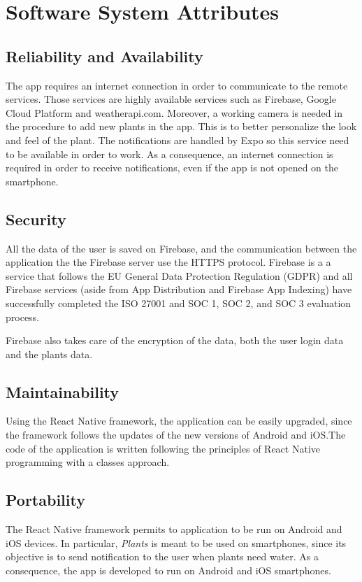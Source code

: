 \documentclass[10pt]{article}
\begin{document}
	\section{Software System Attributes}
	\subsection{Reliability and Availability}
	The app requires an internet connection in order to communicate to the remote services. Those services are highly available services such as Firebase, Google Cloud Platform and weatherapi.com. Moreover, a working camera is needed in the procedure to add new plants in the app. This is to better personalize the look and feel of the plant. The notifications are handled by Expo so this service need to be available in order to work. As a consequence, an internet connection is required in order to receive notifications, even if the app is not opened on the smartphone. 
	\subsection{Security}
	All the data of the user is saved on Firebase, and the communication between the application the the Firebase server use the HTTPS protocol. Firebase is a a service that follows the EU General Data Protection Regulation (GDPR) and all Firebase services (aside from App Distribution and Firebase App Indexing) have successfully completed the ISO 27001 and SOC 1, SOC 2, and SOC 3 evaluation process. 
	
	Firebase also takes care of the encryption of the data, both the user login data and the plants data.
	\subsection{Maintainability}
	Using the React Native framework, the application can be easily upgraded, since the framework follows the updates of the new versions of Android and iOS.The code of the application is written following the principles of React Native programming with a classes approach. 
	\subsection{Portability}
	The React Native framework permits to application to be run on Android and iOS devices. In particular, \textit{Plants} is meant to be used on smartphones, since its objective is to send notification to the user when plants need water. As a consequence, the app is developed to run on Android and iOS smartphones.
	\newpage
    
\end{document}
